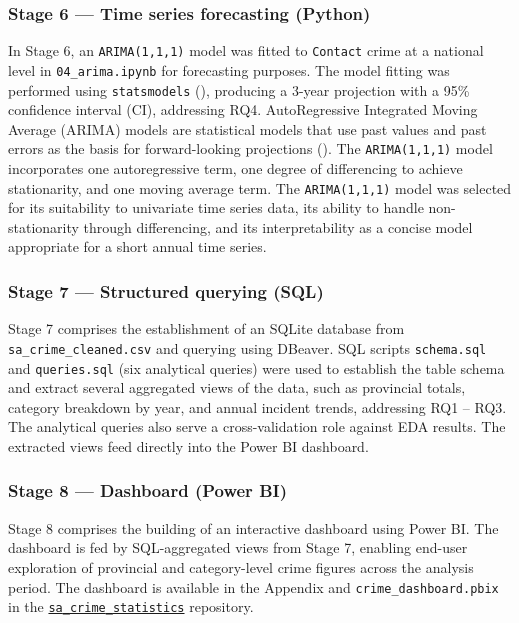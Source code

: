 \documentclass[titlepage, 12pt, oneside]{article}
\numberwithin{equation}{section}
\begin{document}
    \subsubsection*{Stage 6 --- Time series forecasting (Python)} \label{stage6}
    In Stage 6, an \texttt{ARIMA(1,1,1)} model was fitted to \texttt{Contact} crime at a national level in \texttt{04{\_}arima.ipynb} for forecasting purposes. The model fitting was performed using \texttt{statsmodels} (\cite{seabold2010}), producing a 3-year projection with a 95\% confidence interval (CI), addressing RQ4. AutoRegressive Integrated Moving Average (ARIMA) models are statistical models that use past values and past errors as the basis for forward-looking projections (\cite{box2015}). The \texttt{ARIMA(1,1,1)} model incorporates one autoregressive term, one degree of differencing to achieve stationarity, and one moving average term. The \texttt{ARIMA(1,1,1)} model was selected for its suitability to univariate time series data, its ability to handle non-stationarity through differencing, and its interpretability as a concise model appropriate for a short annual time series.
   
    \subsubsection*{Stage 7 --- Structured querying (SQL)} \label{stage7}
    Stage 7 comprises the establishment of an SQLite database from \texttt{sa{\_}crime{\_}cleaned.csv} and querying using DBeaver. SQL scripts \texttt{schema.sql} and \texttt{queries.sql} (six analytical queries) were used to establish the table schema and extract several aggregated views of the data, such as provincial totals, category breakdown by year, and annual incident trends, addressing RQ1 -- RQ3. The analytical queries also serve a cross-validation role against EDA results. The extracted views feed directly into the Power BI dashboard.    
    
    \subsubsection*{Stage 8 --- Dashboard (Power BI)}  \label{stage8}
    Stage 8 comprises the building of an interactive dashboard using Power BI. The dashboard is fed by SQL-aggregated views from Stage 7, enabling end-user exploration of provincial and category-level crime figures across the analysis period. The dashboard is available in the Appendix and \texttt{crime{\_}dashboard.pbix} in the \href{https://github.com/joshua-pillay/sa-crime-statistics}{\texttt{sa{\_}crime{\_}statistics}} repository. 
	
\end{document}
